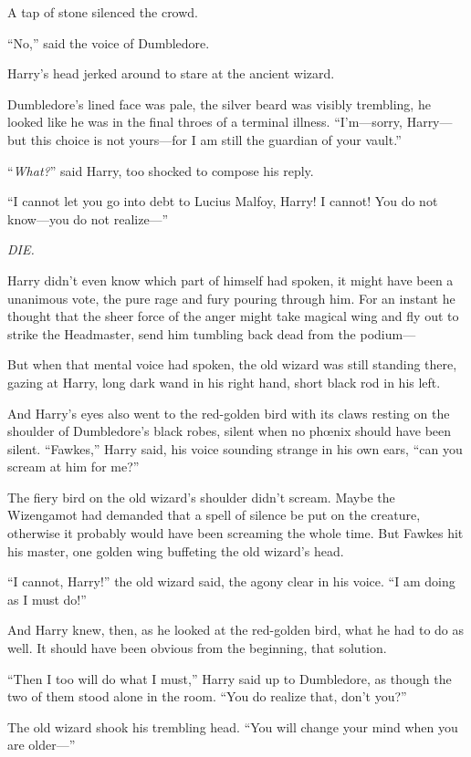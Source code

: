A tap of stone silenced the crowd.

“No,” said the voice of Dumbledore.

Harry’s head jerked around to stare at the ancient wizard.

Dumbledore’s lined face was pale, the silver beard was visibly trembling, he looked like he was in the final throes of a terminal illness. “I’m—sorry, Harry—but this choice is not yours—for I am still the guardian of your vault.”

“\emph{What?}” said Harry, too shocked to compose his reply.

“I cannot let you go into debt to Lucius Malfoy, Harry! I cannot! You do not know—you do not realize—”

\emph{DIE.}

Harry didn’t even know which part of himself had spoken, it might have been a unanimous vote, the pure rage and fury pouring through him. For an instant he thought that the sheer force of the anger might take magical wing and fly out to strike the Headmaster, send him tumbling back dead from the podium—

But when that mental voice had spoken, the old wizard was still standing there, gazing at Harry, long dark wand in his right hand, short black rod in his left.

And Harry’s eyes also went to the red-golden bird with its claws resting on the shoulder of Dumbledore’s black robes, silent when no phœnix should have been silent. “Fawkes,” Harry said, his voice sounding strange in his own ears, “can you scream at him for me?”

The fiery bird on the old wizard’s shoulder didn’t scream. Maybe the Wizengamot had demanded that a spell of silence be put on the creature, otherwise it probably would have been screaming the whole time. But Fawkes hit his master, one golden wing buffeting the old wizard’s head.

“I cannot, Harry!” the old wizard said, the agony clear in his voice. “I am doing as I must do!”

And Harry knew, then, as he looked at the red-golden bird, what he had to do as well. It should have been obvious from the beginning, that solution.

“Then I too will do what I must,” Harry said up to Dumbledore, as though the two of them stood alone in the room. “You do realize that, don’t you?”

The old wizard shook his trembling head. “You will change your mind when you are older—”

